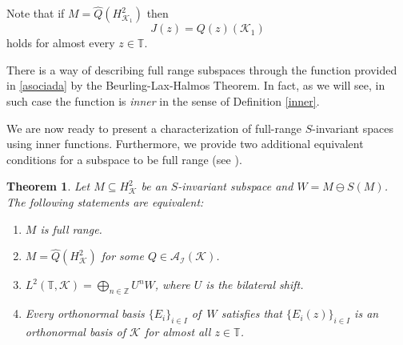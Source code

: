 \documentclass[a4paper,12pt]{amsart}
\def\cA{{\mathcal{A}}}
\def\cI{{\mathcal{I}}}
\def\KK{{\mathcal{K}}}
\def\T{{\mathbb{T}}}
\def\Z{{\mathbb{Z}}}
\newtheorem{theorem}{Theorem}[section]
\theoremstyle{definition}
\begin{document}
Note that if $M=\widehat{Q}(H^2_{\KK_1})$ then
\begin{equation*}
J(z)=Q(z)(\KK_1)
\end{equation*}
holds for almost every $z\in\T$.



There is a way of describing full range subspaces through the function provided in \eqref{asociada} by the Beurling-Lax-Halmos Theorem. In fact, as we will see, in such case the function is {\em inner} in the sense of Definition \ref{inner}.

 We are now ready to present a characterization of full-range $S$-invariant spaces using inner functions. Furthermore, we provide two additional equivalent conditions for a subspace to be full range (see \cite{Fill,H}).

\begin{theorem}\label{lem:full-range}
Let $M\subseteq H^2_\KK$ be an $S$-invariant subspace and $W=M\ominus S(M)$. The following statements are equivalent:
\begin{enumerate}[label=(\roman*),ref=(\roman*)]
\item $M$ is full range.

\item $M=\widehat{Q}(H^2_\KK)$ for some $Q \in \cA_\cI(\KK)$.

\item $L^2(\T,\KK)=\displaystyle\bigoplus_{n\in\Z}U^nW$, where $U$ is the bilateral shift.

\item Every orthonormal basis $\{E_i\}_{i\in I}$ of \,$W$ satisfies that $\{E_i(z)\}_{i\in I}$ is an orthonormal basis of $\KK$ for almost all $z\in\T$.
\end{enumerate}
\end{theorem}
\end{document}
